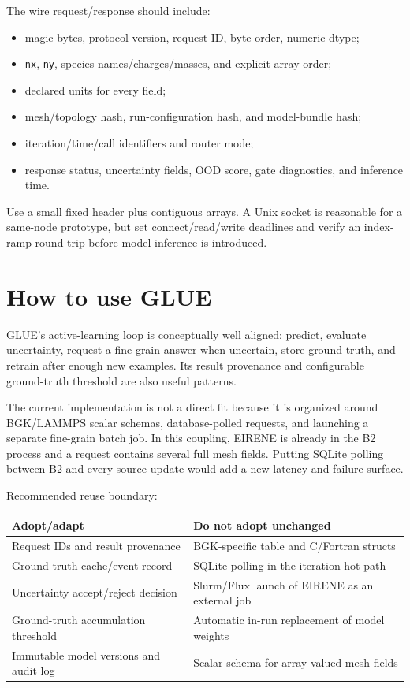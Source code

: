 \documentclass[11pt]{article}
\begin{document}
The wire request/response should include:

\begin{itemize}
\item magic bytes, protocol version, request ID, byte order, numeric dtype;
\item \texttt{nx}, \texttt{ny}, species names/charges/masses, and explicit array order;
\item declared units for every field;
\item mesh/topology hash, run-configuration hash, and model-bundle hash;
\item iteration/time/call identifiers and router mode;
\item response status, uncertainty fields, OOD score, gate diagnostics, and inference time.
\end{itemize}

Use a small fixed header plus contiguous arrays. A Unix socket is reasonable for a same-node prototype, but set connect/read/write deadlines and verify an index-ramp round trip before model inference is introduced.

\section{How to use GLUE}

GLUE's active-learning loop is conceptually well aligned: predict, evaluate uncertainty, request a fine-grain answer when uncertain, store ground truth, and retrain after enough new examples. Its result provenance and configurable ground-truth threshold are also useful patterns.

The current implementation is not a direct fit because it is organized around BGK/LAMMPS scalar schemas, database-polled requests, and launching a separate fine-grain batch job. In this coupling, EIRENE is already in the B2 process and a request contains several full mesh fields. Putting SQLite polling between B2 and every source update would add a new latency and failure surface.

Recommended reuse boundary:

\begin{tabularx}{\linewidth}{@{}YY@{}}
\toprule
Adopt/adapt & Do not adopt unchanged \\
\midrule
Request IDs and result provenance & BGK-specific table and C/Fortran structs \\
Ground-truth cache/event record & SQLite polling in the iteration hot path \\
Uncertainty accept/reject decision & Slurm/Flux launch of EIRENE as an external job \\
Ground-truth accumulation threshold & Automatic in-run replacement of model weights \\
Immutable model versions and audit log & Scalar schema for array-valued mesh fields \\
\bottomrule
\end{tabularx}
\end{document}
